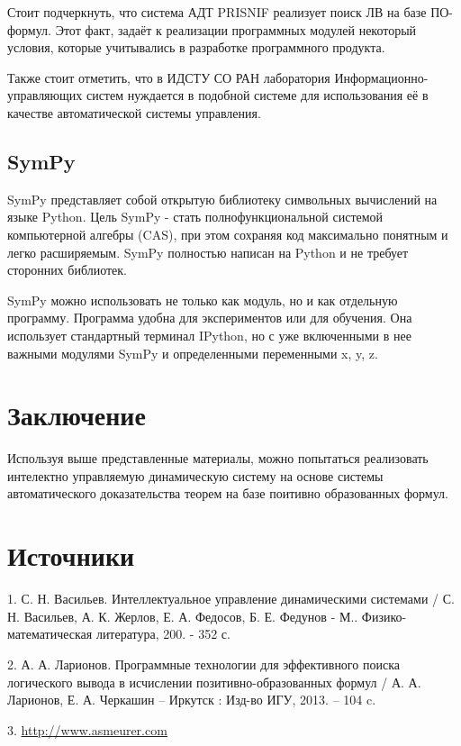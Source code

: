 Стоит подчеркнуть, что система АДТ PRISNIF реализует поиск ЛВ на базе ПО-формул. Этот факт, задаёт к реализации программных модулей некоторый условия, которые учитывались в разработке программного продукта.

Также стоит отметить, что в ИДСТУ СО РАН лаборатория Информационно-управляющих систем нуждается в подобной системе для использования её в качестве автоматической системы управления.

\subsection{SymPy}
SymPy представляет собой открытую библиотеку символьных вычислений на языке Python. Цель SymPy - стать полнофункциональной системой компьютерной алгебры (CAS), при этом сохраняя код максимально понятным и легко расширяемым. SymPy полностью написан на Python и не требует сторонних библиотек.

SymPy можно использовать не только как модуль, но и как отдельную программу. Программа удобна для экспериментов или для обучения. Она использует стандартный терминал IPython, но с уже включенными в нее важными модулями SymPy и определенными переменными x, y, z.

\newpage
\section{Заключение}

Используя выше представленные материалы, можно попытаться реализовать интелектно управляемую динамическую систему на основе системы автоматического доказательства теорем на базе поитивно образованных формул.

\newpage

\section{Источники}

1. С. Н. Васильев. Интеллектуальное управление динамическими системами / С. Н. Васильев, А. К. Жерлов, Е. А. Федосов, Б. Е. Федунов - М.. Физико-математическая литература, 200. - 352 с.

2. А. А. Ларионов. Программные технологии для эффективного поиска логического вывода в исчислении позитивно-образованных формул / А. А. Ларионов, Е. А. Черкашин – Иркутск : Изд-во ИГУ, 2013. – 104 c.

3. \url{http://www.asmeurer.com}

